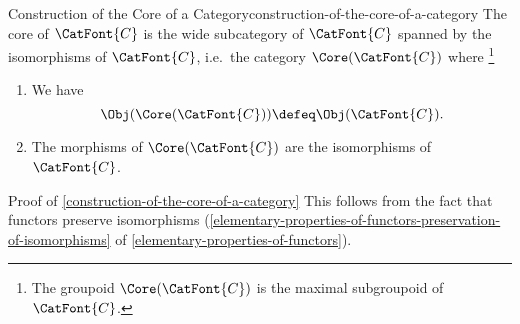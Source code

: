 \begin{construction}{Construction of the Core of a Category}{construction-of-the-core-of-a-category}%
    The core of $\CatFont{C}$ is the wide subcategory of $\CatFont{C}$ spanned by the isomorphisms of $\CatFont{C}$, i.e.\ the category $\Core(\CatFont{C})$ where%
    \footnote{%
        The groupoid $\Core(\CatFont{C})$ is the maximal subgroupoid of $\CatFont{C}$.
        \par\vspace*{-1.75\baselineskip}
    }%
    \begin{enumerate}
        \item{}We have
            \[
                \Obj(\Core(\CatFont{C}))
                \defeq
                \Obj(\CatFont{C}).
            \]%
        \item{}The morphisms of $\Core(\CatFont{C})$ are the isomorphisms of $\CatFont{C}$.
    \end{enumerate}
\end{construction}
\begin{Proof}{Proof of \cref{construction-of-the-core-of-a-category}}%
    This follows from the fact that functors preserve isomorphisms (\cref{elementary-properties-of-functors-preservation-of-isomorphisms} of \cref{elementary-properties-of-functors}).
\end{Proof}

